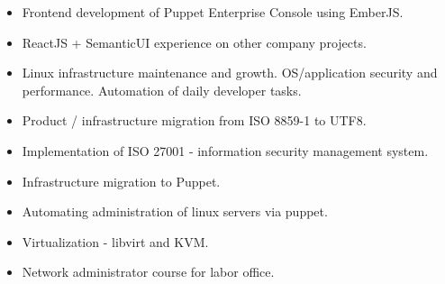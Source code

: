 \documentclass[10pt,a4paper]{altacv}
\begin{document}
    \begin{itemize}
      \item Frontend development of Puppet Enterprise Console using EmberJS.
      \item ReactJS + SemanticUI experience on other company projects.
    \end{itemize}
  \divider

    \begin{itemize}
      \item Linux infrastructure maintenance and growth. OS/application security and performance. Automation of daily developer tasks.
      \item Product / infrastructure migration from ISO 8859-1 to UTF8.
      \item Implementation of ISO 27001 - information security management system.
      \item Infrastructure migration to Puppet.
    \end{itemize}
  \divider

    \begin{itemize}
      \item Automating administration of linux servers via puppet.
      \item Virtualization - libvirt and KVM.
    \end{itemize}
  \divider

    \begin{itemize}
      \item{Network administrator course for labor office.}
    \end{itemize}
  \divider

\clearpage
\end{document}
